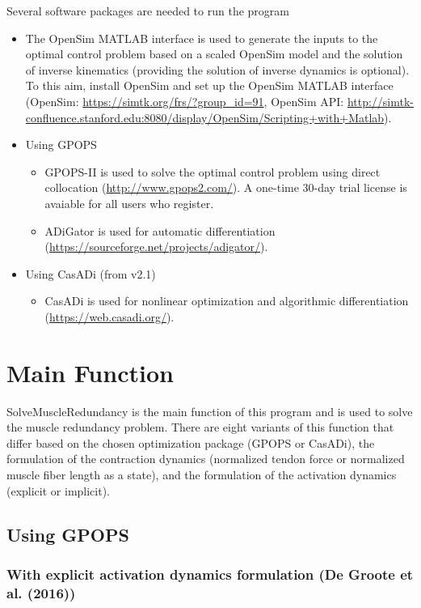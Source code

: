 \documentclass[a4paper,oneside,11pt]{article}
\begin{document}
Several software packages are needed to run the program
\begin{itemize}
	\item The OpenSim MATLAB interface is used to generate the inputs to the optimal control problem based on a scaled OpenSim model and the solution of inverse kinematics (providing the solution of inverse dynamics is optional). To this aim, install OpenSim and set up the OpenSim MATLAB interface (OpenSim: \url{https://simtk.org/frs/?group_id=91}, OpenSim API: \url{http://simtk-confluence.stanford.edu:8080/display/OpenSim/Scripting+with+Matlab}).
	\item Using GPOPS
	\begin{itemize}
	\item GPOPS-II is used to solve the optimal control problem using direct collocation (\url{http://www.gpops2.com/}). A one-time 30-day trial license is avaiable for all users who register.
	\item ADiGator is used for automatic differentiation (\url{https://sourceforge.net/projects/adigator/}).
	\end{itemize}
	\item Using CasADi (from v2.1)
	\begin{itemize}
	\item CasADi is used for nonlinear optimization and algorithmic differentiation (\url{https://web.casadi.org/}).
	\end{itemize}
\end{itemize}

\section{Main Function}

SolveMuscleRedundancy is the main function of this program and is used to solve the muscle redundancy problem. There are eight variants of this function that differ based on the chosen optimization package (GPOPS or CasADi), the formulation of the contraction dynamics (normalized tendon force or normalized muscle fiber length as a state), and the formulation of the activation dynamics (explicit or implicit).

\subsection{Using GPOPS}

\subsubsection{With explicit activation dynamics formulation (De Groote et al. (2016))}
\end{document}
